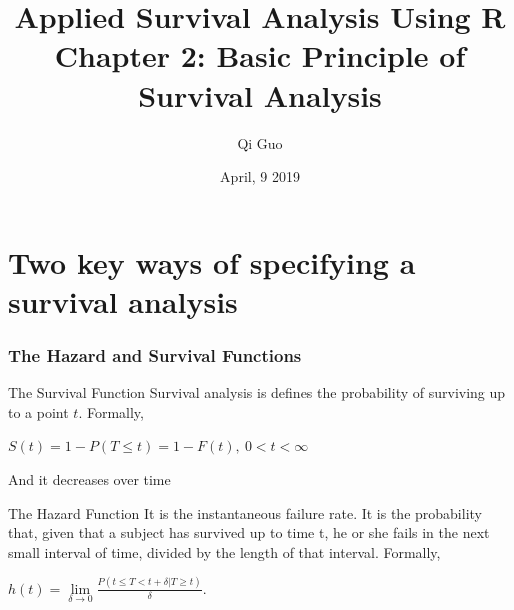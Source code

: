 \documentclass{beamer}
\title[Survival Analysis]{Applied Survival Analysis Using R\\ Chapter 2: Basic Principle of Survival Analysis}
\author[Qi Guo]{Qi Guo}
\institute[UTD]{Department of Mathematical Sciences \\ 
The University of Texas at Dallas}
\date{April, 9 2019}
\begin{document}
\begin{frame}
  \titlepage
\end{frame}

\bgroup
{}


\section[Outline]{}
\begin{frame}
  \tableofcontents
\end{frame}

\section{Two key ways of specifying a survival analysis}
\begin{frame}
\frametitle{The Hazard and Survival Functions}
\begin{defblock}{The Survival Function}
	Survival analysis is defines the probability of surviving up to a point $t$. Formally,\linebreak \centerline{$S(t) = 1 - P (T\le t) = 1 - F(t),\   0<t<\infty$} \linebreak And it decreases over time
\end{defblock}

\begin{defblock}{The Hazard Function}
	It is the {\color{red} instantaneous failure rate}. It is the probability that, given that a subject has survived up to time t, he or she fails in the next small interval of time, divided by the length of that interval. Formally,\linebreak \centerline{
		$h(t) =  \lim\limits_{\delta\to0}\frac{P(t\le T < t + \delta|T\ge t)}{\delta}.$
		}
\end{defblock}
\end{frame}
\end{document}
